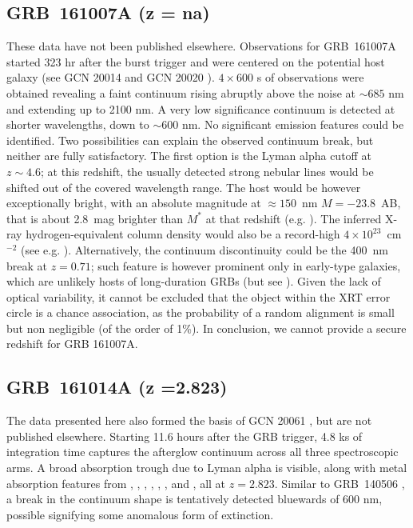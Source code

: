 \documentclass[longauth]{aa}    %
\begin{document}
\subsection{GRB~161007A (z = na)} \label{161007}

These data have not been published elsewhere. Observations for GRB~161007A
started 323 hr after the burst trigger and were centered on the potential host
galaxy (see GCN 20014 \citep{GCN20014} and GCN 20020 \citep{GCN20020}). $4
\times 600$ s of observations were obtained revealing a faint continuum rising
abruptly above the noise at $\sim 685$ nm and extending up to 2100 nm. A very
low significance continuum is detected at shorter wavelengths, down to $\sim
600$ nm. No significant emission features could be identified. Two possibilities
can explain the observed continuum break, but neither are fully satisfactory.
The first option is the Lyman alpha cutoff at $z \sim 4.6$; at this redshift, the
usually detected strong nebular lines would be shifted out of the covered
wavelength range. The host would be however exceptionally bright, with an
absolute magnitude at $\approx 150$~nm{} $M = -23.8$~AB, that is about 2.8~mag
brighter than $M^*$ at that redshift (e.g. \citealt{Bouwens2015}). The inferred
X-ray hydrogen-equivalent column density would also be a record-high $4 \times
10^{23}$~cm$^{-2}$ (see e.g. \citealt{Campana2012}). Alternatively, the
continuum discontinuity could be the 400~nm{} break at $z = 0.71$; such
feature is however prominent only in early-type galaxies, which are unlikely
hosts of long-duration GRBs (but see \citealt{Rossi2014}). Given the lack of
optical variability, it cannot be excluded that the object within the XRT error
circle is a chance association, as the probability of a random alignment is
small but non negligible (of the order of 1\%). In conclusion, we cannot provide
a secure redshift for GRB 161007A.

\subsection{GRB~161014A (z =2.823)} \label{161014}

The data presented here also formed the basis of GCN  20061 \citep{GCN20061},
but are not published elsewhere. Starting 11.6 hours after the GRB trigger, 4.8
ks of integration time captures the afterglow continuum across all three
spectroscopic arms. A broad absorption trough due to Lyman alpha is visible,
along with metal absorption features from \mgii, \SIii, \cii, \civ, \alii,
\aliii, and	\feii, all at $z =2.823$. Similar to GRB~140506 \citep{Fynbo2014,
	Heintz2017b}, a break in the continuum shape is tentatively detected bluewards
of 600 nm, possible signifying some anomalous form of extinction.
\end{document}
